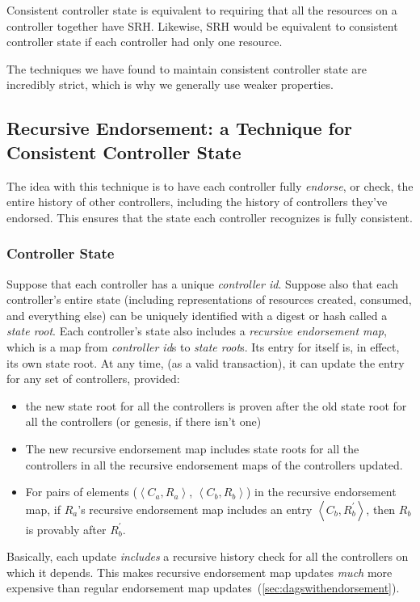 \documentclass[a4paper,USenglish,cleveref, autoref, thm-restate, anonymous]{lipics-v2021}
\begin{document}
Consistent controller state is equivalent to requiring that all the resources on a controller together have SRH.
Likewise, SRH would be equivalent to consistent controller state if each controller had only one resource.

The techniques we have found to maintain consistent controller state are incredibly strict, which is why we generally use weaker properties.

\subsection{Recursive Endorsement: a Technique for Consistent Controller State}
The idea with this technique is to have each controller fully \textit{endorse}, or check, the entire history of other controllers, including the history of controllers they've endorsed.
This ensures that the state each controller recognizes is fully consistent.

\subsubsection{Controller State}
Suppose that each controller has a unique \textit{controller id}.
Suppose also that each controller's entire state (including representations of resources created, consumed, and everything else) can be uniquely identified with a digest or hash called a \textit{state root}.
Each controller's state also includes a \textit{recursive endorsement map}, which is a map from \textit{controller id}s to \textit{state root}s.
Its entry for itself is, in effect, its own state root.
At any time, (as a valid transaction), it can update the entry for any set of controllers, provided:
\begin{itemize}
    \item the new state root for all the controllers is proven after the old state root for all the controllers (or genesis, if there isn't one)
    \item The new recursive endorsement map includes state roots for all the controllers in all the recursive endorsement maps of the controllers updated.
    \item For pairs of elements ($\left\langle C_a, R_a\right\rangle$, $\left\langle C_b, R_b\right\rangle$) in the recursive endorsement map, if $R_a$'s recursive endorsement map includes an entry $\left\langle C_b, R_b^\prime\right\rangle$, then $R_b$ is provably after $R_b^\prime$.
\end{itemize}
Basically, each update \textit{includes} a recursive history check for all the controllers on which it depends.
This makes recursive endorsement map updates \emph{much} more expensive than regular endorsement map updates~(\cref{sec:dagswithendorsement}).
\end{document}
